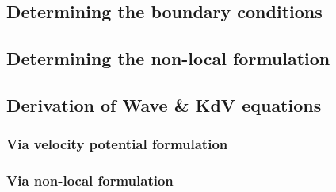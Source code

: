\documentclass[10pt,reqno,oneside,a4paper]{article}
\begin{document}
\subsection{Determining the boundary conditions}

\subsection{Determining the non-local formulation}

\subsection{Derivation of Wave \& KdV equations}

\subsubsection{Via velocity potential formulation}

\subsubsection{Via non-local formulation}


{\small}
\end{document}

